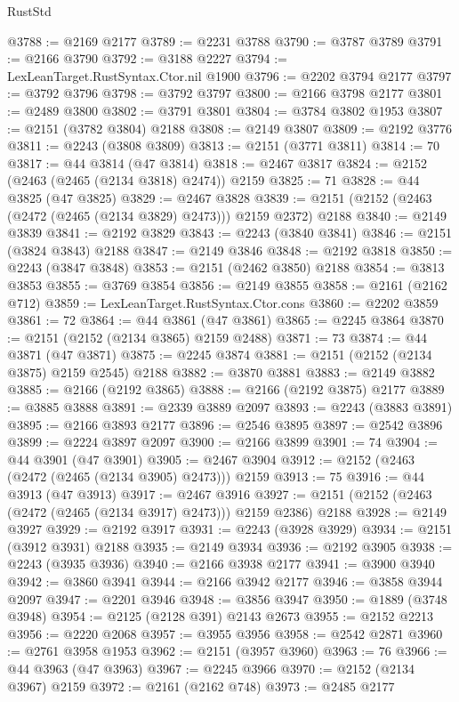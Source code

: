 \begin{lexlean}{RustStd}
\begin{coremodule}
@3788 := @2169 @2177
@3789 := @2231 @3788
@3790 := @3787 @3789
@3791 := @2166 @3790
@3792 := @3188 @2227
@3794 := LexLeanTarget.RustSyntax.Ctor.nil @1900
@3796 := @2202 @3794 @2177
@3797 := @3792 @3796
@3798 := @3792 @3797
@3800 := @2166 @3798 @2177
@3801 := @2489 @3800
@3802 := @3791 @3801
@3804 := @3784 @3802 @1953
@3807 := @2151 (@3782 @3804) @2188
@3808 := @2149 @3807
@3809 := @2192 @3776
@3811 := @2243 (@3808 @3809)
@3813 := @2151 (@3771 @3811)
@3814 := 70
@3817 := @44 @3814 (@47 @3814)
@3818 := @2467 @3817
@3824 := @2152 (@2463 (@2465 (@2134 @3818) @2474)) @2159
@3825 := 71
@3828 := @44 @3825 (@47 @3825)
@3829 := @2467 @3828
@3839 := @2151 (@2152 (@2463 (@2472 (@2465 (@2134 @3829) @2473))) @2159 @2372) @2188
@3840 := @2149 @3839
@3841 := @2192 @3829
@3843 := @2243 (@3840 @3841)
@3846 := @2151 (@3824 @3843) @2188
@3847 := @2149 @3846
@3848 := @2192 @3818
@3850 := @2243 (@3847 @3848)
@3853 := @2151 (@2462 @3850) @2188
@3854 := @3813 @3853
@3855 := @3769 @3854
@3856 := @2149 @3855
@3858 := @2161 (@2162 @712)
@3859 := LexLeanTarget.RustSyntax.Ctor.cons
@3860 := @2202 @3859
@3861 := 72
@3864 := @44 @3861 (@47 @3861)
@3865 := @2245 @3864
@3870 := @2151 (@2152 (@2134 @3865) @2159 @2488)
@3871 := 73
@3874 := @44 @3871 (@47 @3871)
@3875 := @2245 @3874
@3881 := @2151 (@2152 (@2134 @3875) @2159 @2545) @2188
@3882 := @3870 @3881
@3883 := @2149 @3882
@3885 := @2166 (@2192 @3865)
@3888 := @2166 (@2192 @3875) @2177
@3889 := @3885 @3888
@3891 := @2339 @3889 @2097
@3893 := @2243 (@3883 @3891)
@3895 := @2166 @3893 @2177
@3896 := @2546 @3895
@3897 := @2542 @3896
@3899 := @2224 @3897 @2097
@3900 := @2166 @3899
@3901 := 74
@3904 := @44 @3901 (@47 @3901)
@3905 := @2467 @3904
@3912 := @2152 (@2463 (@2472 (@2465 (@2134 @3905) @2473))) @2159
@3913 := 75
@3916 := @44 @3913 (@47 @3913)
@3917 := @2467 @3916
@3927 := @2151 (@2152 (@2463 (@2472 (@2465 (@2134 @3917) @2473))) @2159 @2386) @2188
@3928 := @2149 @3927
@3929 := @2192 @3917
@3931 := @2243 (@3928 @3929)
@3934 := @2151 (@3912 @3931) @2188
@3935 := @2149 @3934
@3936 := @2192 @3905
@3938 := @2243 (@3935 @3936)
@3940 := @2166 @3938 @2177
@3941 := @3900 @3940
@3942 := @3860 @3941
@3944 := @2166 @3942 @2177
@3946 := @3858 @3944 @2097
@3947 := @2201 @3946
@3948 := @3856 @3947
@3950 := @1889 (@3748 @3948)
@3954 := @2125 (@2128 @391) @2143 @2673
@3955 := @2152 @2213
@3956 := @2220 @2068
@3957 := @3955 @3956
@3958 := @2542 @2871
@3960 := @2761 @3958 @1953
@3962 := @2151 (@3957 @3960)
@3963 := 76
@3966 := @44 @3963 (@47 @3963)
@3967 := @2245 @3966
@3970 := @2152 (@2134 @3967) @2159
@3972 := @2161 (@2162 @748)
@3973 := @2485 @2177

\end{coremodule}
\end{lexlean}
